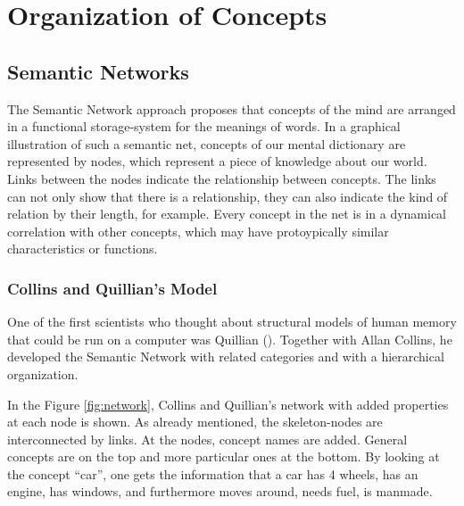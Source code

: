 \documentclass[
]{krantz}
\begin{document}
\section{Organization of Concepts}\label{organization-of-concepts}

\subsection*{Semantic Networks}\label{semantic-networks}


The Semantic Network approach proposes that concepts of the mind are arranged in a functional storage-system for the meanings of words. In a graphical illustration of such a semantic net, concepts of our mental dictionary are represented by nodes, which represent a piece of knowledge about our world. Links between the nodes indicate the relationship between concepts. The links can not only show that there is a relationship, they can also indicate the kind of relation by their length, for example. Every concept in the net is in a dynamical correlation with other concepts, which may have protoypically similar characteristics or functions.

\subsubsection*{Collins and Quillian's Model}\label{collins-and-quillians-model}


One of the first scientists who thought about structural models of human memory that could be run on a computer was Quillian (). Together with Allan Collins, he developed the Semantic Network with related categories and with a hierarchical organization.

In the Figure \ref{fig:network}, Collins and Quillian's network with added properties at each node is shown. As already mentioned, the skeleton-nodes are interconnected by links. At the nodes, concept names are added. General concepts are on the top and more particular ones at the bottom. By looking at the concept ``car'', one gets the information that a car has 4 wheels, has an engine, has windows, and furthermore moves around, needs fuel, is manmade.
\end{document}
